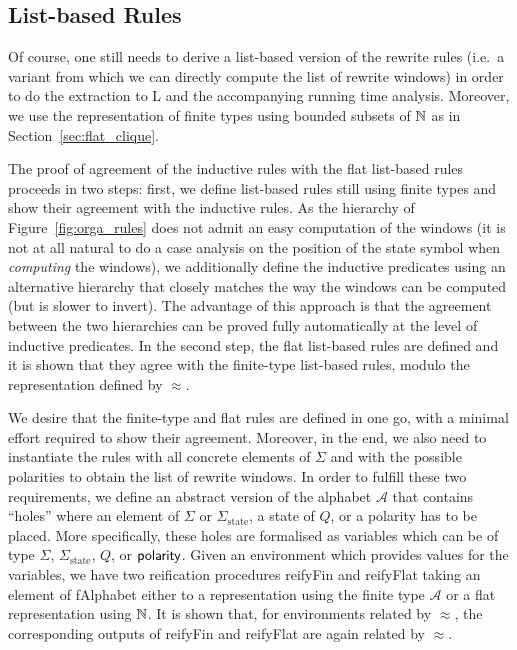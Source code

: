 \subsection{List-based Rules}
Of course, one still needs to derive a list-based version of the rewrite rules (i.e.\ a variant from which we can directly compute the list of rewrite windows) in order to do the extraction to L and the accompanying running time analysis. Moreover, we use the representation of finite types using bounded subsets of $\mathbb{N}$ as in Section~\ref{sec:flat_clique}. 

The proof of agreement of the inductive rules with the flat list-based rules proceeds in two steps: first, we define list-based rules still using finite types and show their agreement with the inductive rules. As the hierarchy of Figure~\ref{fig:orga_rules} does not admit an easy computation of the windows (it is not at all natural to do a case analysis on the position of the state symbol when \textit{computing} the windows), we additionally define the inductive predicates using an alternative hierarchy that closely matches the way the windows can be computed (but is slower to invert). The advantage of this approach is that the agreement between the two hierarchies can be proved fully automatically at the level of inductive predicates.
In the second step, the flat list-based rules are defined and it is shown that they agree with the finite-type list-based rules, modulo the representation defined by $\approx$. 

We desire that the finite-type and flat rules are defined in one go, with a minimal effort required to show their agreement.
Moreover, in the end, we also need to instantiate the rules with all concrete elements of $\Sigma$ and with the possible polarities to obtain the list of rewrite windows. 
In order to fulfill these two requirements, we define an abstract version  of the alphabet $\mathcal{A}$ that contains ``holes'' where an element of $\Sigma$ or $\Sigma_{\text{state}}$, a state of $Q$, or a polarity has to be placed. 
More specifically, these holes are formalised as variables which can be of type $\Sigma$, $\Sigma_{\text{state}}$, $Q$, or $\textsf{polarity}$. 
Given an environment which provides values for the variables, we have two reification procedures \textsf{reifyFin}
and \textsf{reifyFlat} taking an element of \textsf{fAlphabet} either to a representation using the finite type $\mathcal{A}$ or a flat representation using $\mathbb{N}$.
It is shown that, for environments related by $\approx$, the corresponding outputs of \textsf{reifyFin} and \textsf{reifyFlat} are again related by $\approx$.

